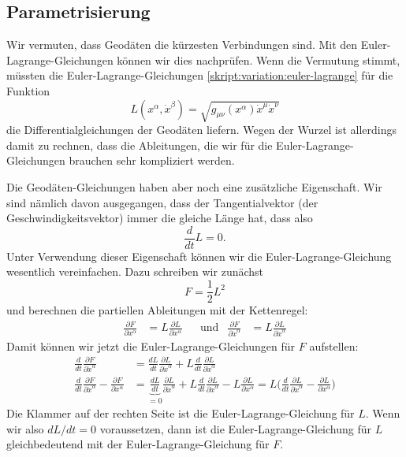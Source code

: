 \subsection{Parametrisierung}
Wir vermuten, dass Geodäten die kürzesten Verbindungen sind.
Mit den Euler-Lagrange-Gleichungen können wir dies nachprüfen.
Wenn die Vermutung stimmt, müssten die Euler-Lagrange-Gleichungen 
\eqref{skript:variation:euler-lagrange}
für die Funktion
\[
L(x^\alpha, \dot x^\beta) =\sqrt{g_{\mu\nu}(x^\alpha)\dot x^\mu\dot x^\nu}
\]
die Differentialgleichungen der Geodäten liefern.
Wegen der Wurzel ist allerdings damit zu rechnen, dass die
Ableitungen, die wir für die Euler-Lagrange-Gleichungen brauchen sehr
kompliziert werden.

Die Geodäten-Gleichungen haben aber noch eine zusätzliche Eigenschaft.
Wir sind nämlich davon ausgegangen, dass der Tangentialvektor (der
Geschwindigkeitsvektor) immer die gleiche Länge hat, dass also
\[
\frac{d}{dt}L=0.
\]
Unter Verwendung dieser Eigenschaft können wir die Euler-Lagrange-Gleichung
wesentlich vereinfachen.
Dazu schreiben wir zunächst
\[
F=\frac12 L^2
\]
und berechnen die partiellen Ableitungen mit der Kettenregel:
\[
\begin{aligned}
\frac{\partial F}{\partial x^\alpha}
&=
L
\frac{\partial L}{\partial x^\alpha}
&&\text{und}
&
\frac{\partial F}{\partial \dot x^\alpha}
&=
L\frac{\partial L}{\partial\dot x^\alpha}
\end{aligned}
\]
Damit können wir jetzt die Euler-Lagrange-Gleichungen für $F$ aufstellen:
\begin{align*}
\frac{d}{dt}
\frac{\partial F}{\partial \dot x^\alpha}
&=
\frac{dL}{dt} \frac{\partial L}{\partial\dot x^\alpha}
+
L\frac{d}{dt}\frac{\partial L}{\partial\dot x^\alpha}
\\
\frac{d}{dt}
\frac{\partial F}{\partial \dot x^\alpha}
-
\frac{\partial F}{\partial x^\alpha}
&=
\underbrace{\frac{dL}{dt}}_{\displaystyle =0}
\frac{\partial L}{\partial\dot x^\alpha}
+
L\frac{d}{dt}\frac{\partial L}{\partial\dot x^\alpha}
-
L
\frac{\partial L}{\partial x^\alpha}
=
L\biggl(
\frac{d}{dt}\frac{\partial L}{\partial\dot x^\alpha}
-
\frac{\partial L}{\partial x^\alpha}
\biggr)
\end{align*}
Die Klammer auf der rechten Seite ist die Euler-Lagrange-Gleichung für
$L$.
Wenn wir also $dL/dt=0$ voraussetzen, dann ist die Euler-Lagrange-Gleichung
für $L$ gleichbedeutend mit der Euler-Lagrange-Gleichung für $F$.

